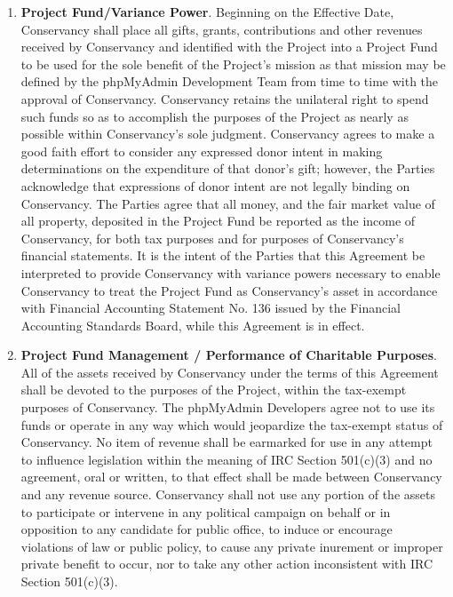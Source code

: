 \documentclass[letterpaper,11pt]{article}
\newcommand{\signatories}{phpMyAdmin Developers\xspace}
\newcommand{\leadershipbody}{phpMyAdmin Development Team\xspace}
\begin{document}
\begin{enumerate}[label=\arabic*.,ref=\S~\arabic*]
Notwithstanding the above, the \signatories agree that should Conservancy
be required to pay any taxes (including but not limited to sales taxes
and unrelated business taxable income) as the result of any activity
of the Project and/or activities undertaken by Conservancy on the
Project's behalf, such taxes shall be deducted from the Project Fund.


Conservancy will monitor any unrelated business taxable income and
may require the Project to cease activities generating such income
if the overall amounts exceed amounts permissible or prudent for Conservancy,
given Conservancy's tax exempt status.

\item \textbf{Project Fund/Variance Power}. Beginning on the Effective Date,
Conservancy shall place all gifts, grants, contributions and other
revenues received by Conservancy and identified with the Project into
a Project Fund to be used for the sole benefit of the Project's mission
as that mission may be defined by the \leadershipbody from
time to time with the approval of Conservancy. Conservancy retains
the unilateral right to spend such funds so as to accomplish the purposes
of the Project as nearly as possible within Conservancy's sole judgment.
Conservancy agrees to make a good faith effort to consider any expressed
donor intent in making determinations on the expenditure of that donor's
gift; however, the Parties acknowledge that expressions of donor intent
are not legally binding on Conservancy. The Parties agree that all
money, and the fair market value of all property, deposited in the
Project Fund be reported as the income of Conservancy, for both tax
purposes and for purposes of Conservancy's financial statements. It
is the intent of the Parties that this Agreement be interpreted to
provide Conservancy with variance powers necessary to enable Conservancy
to treat the Project Fund as Conservancy's asset in accordance with
Financial Accounting Statement No. 136 issued by the Financial Accounting
Standards Board, while this Agreement is in effect. 
\item \textbf{Project Fund Management / Performance of Charitable Purposes}.
\label{CharitablePurpose} All of the assets received by Conservancy
under the terms of this Agreement shall be devoted to the purposes
of the Project, within the tax-exempt purposes of Conservancy. The
\signatories agree not to use its funds or operate in any way which would
jeopardize the tax-exempt status of Conservancy. No item of revenue
shall be earmarked for use in any attempt to influence legislation
within the meaning of IRC Section 501(c)(3) and no agreement, oral
or written, to that effect shall be made between Conservancy and any
revenue source. Conservancy shall not use any portion of the assets
to participate or intervene in any political campaign on behalf or
in opposition to any candidate for public office, to induce or encourage
violations of law or public policy, to cause any private inurement
or improper private benefit to occur, nor to take any other action
inconsistent with IRC Section 501(c)(3). 


\end{enumerate}
\end{document}

